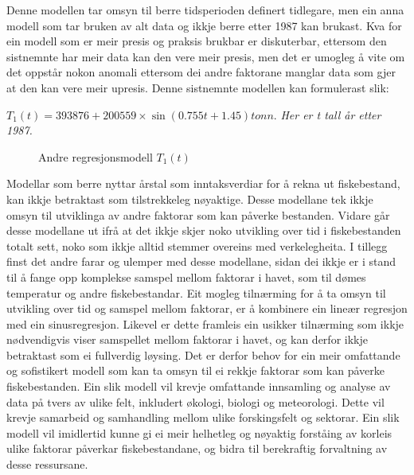 \documentclass{report}
\begin{document}
Denne modellen tar omsyn til berre tidsperioden definert tidlegare, men ein anna modell som tar bruken av alt data og ikkje berre etter 1987 kan brukast.
Kva for ein modell som er meir presis og praksis brukbar er diskuterbar, ettersom den sistnemnte har meir data kan den vere meir presis, men det er umogleg å vite om det oppstår nokon anomali ettersom dei andre faktorane manglar data som gjer at den kan vere meir upresis.
Denne sistnemnte modellen kan formulerast slik:
\begin{center}
	$T_{1}(t) = 393876+200559\times \sin(0.755t+1.45)tonn.$
	\textit{Her er t tall år etter 1987.}
\end{center}

\begin{figure}[H]
	\centering
	\caption{Andre regresjonsmodell $T_1(t)$}
	\label{T1}
\end{figure}

Modellar som berre nyttar årstal som inntaksverdiar for å rekna ut fiskebestand, kan ikkje betraktast som tilstrekkeleg nøyaktige. Desse modellane tek ikkje omsyn til utviklinga av andre faktorar som kan påverke bestanden. Vidare går desse modellane ut ifrå at det ikkje skjer noko utvikling over tid i fiskebestanden totalt sett, noko som ikkje alltid stemmer overeins med verkelegheita. I tillegg finst det andre farar og ulemper med desse modellane, sidan dei ikkje er i stand til å fange opp komplekse samspel mellom faktorar i havet, som til dømes temperatur og andre fiskebestandar.
Eit mogleg tilnærming for å ta omsyn til utvikling over tid og samspel mellom faktorar, er å kombinere ein lineær regresjon med ein sinusregresjon. Likevel er dette framleis ein usikker tilnærming som ikkje nødvendigvis viser samspellet mellom faktorar i havet, og kan derfor ikkje betraktast som ei fullverdig løysing.
Det er derfor behov for ein meir omfattande og sofistikert modell som kan ta omsyn til ei rekkje faktorar som kan påverke fiskebestanden. Ein slik modell vil krevje omfattande innsamling og analyse av data på tvers av ulike felt, inkludert økologi, biologi og meteorologi. Dette vil krevje samarbeid og samhandling mellom ulike forskingsfelt og sektorar. Ein slik modell vil imidlertid kunne gi ei meir helhetleg og nøyaktig forståing av korleis ulike faktorar påverkar fiskebestandane, og bidra til berekraftig forvaltning av desse ressursane.
\end{document}
